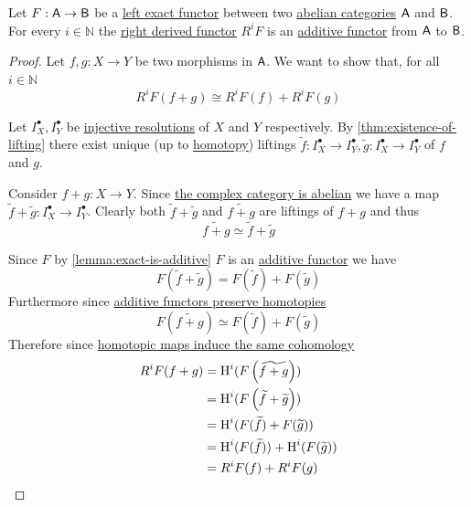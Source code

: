 \documentclass[../../../main]{subfiles}
\begin{document}
\begin{lemma}
  Let \(F: \mathsf{A} \to \mathsf{B}\) be a \hyperref[def:exact-complex-functor]{left exact functor} between two \hyperref[def:abelian-category]{abelian categories} \(\mathsf{A}\) and \(\mathsf{B}\).
  For every \(i \in \mathbb{N}\) the \hyperref[def:right-derived-functor]{right derived functor} \(R^{i}F\) is an \hyperref[def:additive-functor]{additive functor} from \(\mathsf{A}\) to \(\mathsf{B}\).
\end{lemma}
\begin{proof}
  Let \(f, g: X \to Y\) be two morphisms in \(\mathsf{A}\).
  We want to show that, for all \(i \in \mathbb{N}\)
  \begin{equation*}
    R^{i}F(f + g) \cong R^{i}F(f) + R^{i}F(g)
  \end{equation*}

  Let \(I_{X}^{\bullet}, I_{Y}^{\bullet}\) be \hyperref[def:injective-projective-resolution]{injective resolutions} of \(X\) and \(Y\) respectively.
  By \autoref{thm:existence-of-lifting} there exist unique (up to \hyperref[def:homotopy]{homotopy}) liftings \(\widetilde{f}: I_{X}^{\bullet} \to I_{Y}^{\bullet}, \widetilde{g}: I_{X}^{\bullet} \to I_{Y}^{\bullet}\) of \(f\) and \(g\).

  Consider \(f + g: X \to Y\). Since \hyperref[thm:complex-category-is-abelian]{the complex category is abelian} we have a map \(\widetilde{f} + \widetilde{g}: I_{X}^{\bullet} \to I_{Y}^{\bullet}\).
  Clearly both \(\widetilde{f} + \widetilde{g}\) and \(\widetilde{f + g}\) are liftings of \(f + g\) and thus
  \begin{equation*}
    \widetilde{f + g} \simeq \widetilde{f} + \widetilde{g}
  \end{equation*}

  Since \(F\) by \autoref{lemma:exact-is-additive} \(F\) is an \hyperref[def:additive-functor]{additive functor} we have
  \begin{equation*}
    F(\widetilde{f} + \widetilde{g}) = F(\widetilde{f}) + F(\widetilde{g})
  \end{equation*}
  Furthermore since \hyperref[lemma:additive-functors-and-homotopy]{additive functors preserve homotopies}
  \begin{equation*}
    F \left( \widetilde{f + g} \right) \simeq F(\widetilde{f}) + F(\widetilde{g})
  \end{equation*}
  Therefore since \hyperref[cor:homotopy-equivalent-isomorphic-cohomology]{homotopic maps induce the same cohomology}
  \begin{align*}
    R^{i}F(f + g) &= \operatorname{H}^{i}(F \left( \widetilde{f + g} \right)) \\
                  &= \operatorname{H}^{i}(F \left( \widetilde{f} + \widetilde{g}\right)) \\
                  &= \operatorname{H}^{i}(F(\widetilde{f}) + F(\widetilde{g})) \\
                  &= \operatorname{H}^{i}(F(\widetilde{f})) + \operatorname{H}^{i}(F(\widetilde{g})) \\
                  &= R^{i}F(f) + R^{i}F(g)
  \end{align*}
\end{proof}
\end{document}
